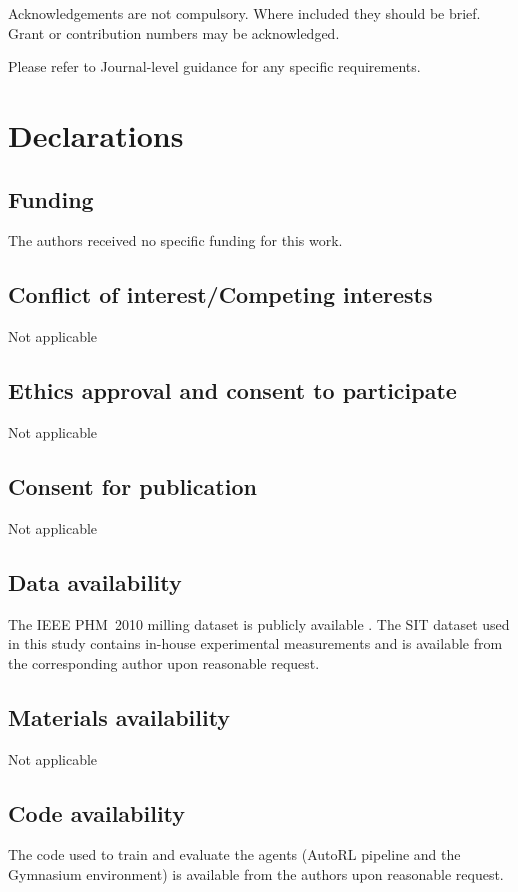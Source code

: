 \documentclass[sn-basic]{sn-jnl} %
\begin{document}
Acknowledgements are not compulsory. Where included they should be brief. Grant or contribution numbers may be acknowledged.

Please refer to Journal-level guidance for any specific requirements.

\section*{Declarations}

\subsection*{Funding}
The authors received no specific funding for this work.

\subsection*{Conflict of interest/Competing interests}
Not applicable

\subsection*{Ethics approval and consent to participate}
Not applicable

\subsection*{Consent for publication}
Not applicable

\subsection*{Data availability}
The IEEE PHM~2010 milling dataset is publicly available \cite{PHMdata2010}. The SIT dataset used in this study contains in-house experimental measurements and is available from the corresponding author upon reasonable request.

\subsection*{Materials availability}
Not applicable

\subsection*{Code availability}
The code used to train and evaluate the agents (AutoRL pipeline and the Gymnasium environment) is available from the authors upon reasonable request.
\end{document}
